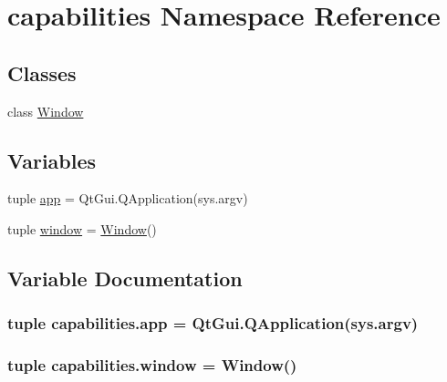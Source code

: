 \hypertarget{namespacecapabilities}{}\section{capabilities Namespace Reference}
\label{namespacecapabilities}
\subsection*{Classes}
\begin{DoxyCompactItemize}
\item 
class \hyperlink{classcapabilities_1_1Window}{Window}
\end{DoxyCompactItemize}
\subsection*{Variables}
\begin{DoxyCompactItemize}
\item 
tuple \hyperlink{namespacecapabilities_a0ecae487b3c12ed24a836c1584766b85}{app} = Qt\+Gui.\+Q\+Application(sys.\+argv)
\item 
tuple \hyperlink{namespacecapabilities_a0b9f76f036fc1d2b68fa7fd5aff6e8a6}{window} = \hyperlink{classcapabilities_1_1Window}{Window}()
\end{DoxyCompactItemize}


\subsection{Variable Documentation}
\hypertarget{namespacecapabilities_a0ecae487b3c12ed24a836c1584766b85}{}
\subsubsection[{app}]{\setlength{\rightskip}{0pt plus 5cm}tuple capabilities.\+app = Qt\+Gui.\+Q\+Application(sys.\+argv)}\label{namespacecapabilities_a0ecae487b3c12ed24a836c1584766b85}
\hypertarget{namespacecapabilities_a0b9f76f036fc1d2b68fa7fd5aff6e8a6}{}
\subsubsection[{window}]{\setlength{\rightskip}{0pt plus 5cm}tuple capabilities.\+window = {\bf Window}()}\label{namespacecapabilities_a0b9f76f036fc1d2b68fa7fd5aff6e8a6}
